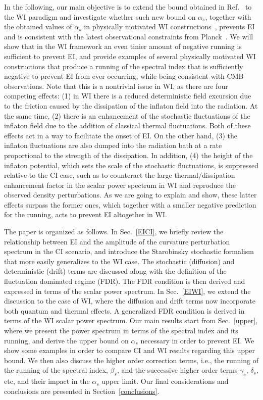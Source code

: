 \documentclass[a4paper,11pt]{article}
\begin{document}
In the following, our main objective is to extend the bound obtained in
Ref.~\cite{Kinney:2014jya} to the WI paradigm and investigate
whether such new bound on $\alpha_s$, together with the obtained
values of $\alpha_s$ in physically motivated WI constructions~\cite{Benetti:2016jhf,Das:2022ubr},
prevents EI  and is consistent with the latest observational constraints from Planck~\cite{Planck:2018jri}. We will show that in the WI framework an even tinier amount of negative running is sufficient to prevent EI, and provide examples of several physically motivated WI constructions that produce a running of the spectral index that is sufficiently negative to prevent EI from ever occurring, while being consistent with CMB observations. 
Note that this is a nontrivial issue in WI, as there are four competing effects:   (1) in WI there is a reduced deterministic
field excursion due to the friction caused by the dissipation of the
inflaton field into the radiation. At the same time,  (2) there is an
enhancement of the stochastic fluctuations of the inflaton field due
to the addition of classical thermal fluctuations.  Both of these
effects act in a way to facilitate the onset of EI.  On the other hand, (3) the inflaton fluctuations are also dumped into the radiation bath at
a rate proportional to the strength of the dissipation.   In addition, (4) the
height of the inflaton potential, which sets the scale of the
stochastic fluctuations, is suppressed relative to the CI case, such
as to counteract the large thermal/dissipation enhancement factor in
the scalar power spectrum in WI and reproduce the observed density
perturbations. As we are going to explain and show, these latter effects surpass
the former ones, which together with a smaller negative prediction for
the running, acts to prevent EI altogether in WI.
 
The paper is organized as follows.  In Sec.~\ref{EICI}, we briefly
review the relationship between EI and the
amplitude of the curvature perturbation spectrum in the CI scenario, and introduce the Starobinsky stochastic formalism that more easily generalizes to the WI case.  The stochastic (diffusion) and deterministic
(drift) terms are discussed along with the definition of the
fluctuation dominated regime (FDR).  The FDR condition is then derived
and expressed in terms of the scalar power spectrum.  In
Sec.~\ref{EIWI}, we extend the discussion to the case of WI, where the
diffusion and drift terms now incorporate both quantum and thermal
effects.  A generalized FDR condition is derived in terms of the WI
scalar power spectrum.  Our main results start from Sec.~\ref{upper},
where we present the power spectrum in terms of the spectral index and
its running, and derive the upper bound on $\alpha_s$ necessary in
order to prevent EI.  We show some examples in order to compare CI and
WI results regarding this upper bound.  We then also discuss the
higher order correction terms, i.e., the running of the running of the
spectral index, $\beta_s$, and the successive higher order terms
$\gamma_s$, $\delta_s$, etc, and their impact in the $\alpha_s$ upper
limit.  Our final considerations and conclusions are presented in
Section~\ref{conclusions}. 
\end{document}
